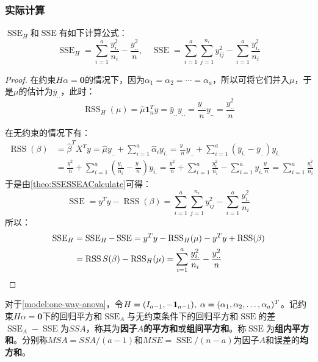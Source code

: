 \subsubsection{实际计算}
\begin{theorem}\label{theo:SSESSEACalculateAOV}
	$\operatorname{SSE}_H$和$\operatorname{SSE}$有如下计算公式：
	\begin{equation*}
		\operatorname{SSE}_H=\sum_{i=1}^{a}\frac{y_{i.}^2}{n_i}-\frac{y_{..}^2}{n},\quad \operatorname{SSE}=\sum_{i=1}^{a}\sum_{j=1}^{n_i}y_{ij}^2-\sum_{i=1}^{a}\frac{y_{i.}^2}{n_i}
	\end{equation*}
\end{theorem}
\begin{proof}
	在约束$H\alpha=\mathbf{0}$的情况下，因为$\alpha_1=\alpha_2=\cdots=\alpha_a$，所以可将它们并入$\mu$，于是$\mu$的估计为$\bar{y}_{..}$，此时：
	\begin{equation*}
		\operatorname{RSS}_H(\mu)=\hat{\mu}\mathbf{1}_n^Ty=\bar{y}_{..}y_{..}=\frac{y_{..}}{n}y_{..}=\frac{y_{..}^2}{n}
	\end{equation*}\par
	在无约束的情况下有：
	\begin{align*}
		\operatorname{RSS}(\beta)&=\hat{\beta}^TX^Ty=\hat{\mu}y_{..}+\sum_{i=1}^{a}\hat{\alpha}_iy_{i.} =\frac{y_{..}}{n}y_{..}+\sum_{i=1}^{a}(\bar{y}_{i.}-\bar{y}_{..})y_{i.} \\
		&=\frac{y_{..}^2}{n}+\sum_{i=1}^{a}\left(\frac{y_{i.}}{n_i}-\frac{y_{..}}{n}\right)y_{i.} =\frac{y_{..}^2}{n}+\sum_{i=1}^{a}\frac{y_{i.}^2}{n_i}-\sum_{i=1}^{a}y_{i.}\frac{y_{..}}{n}=\sum_{i=1}^{a}\frac{y_{i.}^2}{n_i}
	\end{align*}
	于是由\cref{theo:SSESSEACalculate}可得：
	\begin{equation*}
		\operatorname{SSE}=y^Ty-\operatorname{RSS}(\beta)=\sum_{i=1}^{a}\sum_{j=1}^{n_i}y_{ij}^2-\sum_{i=1}^{a}\frac{y_{i.}^2}{n_i}
	\end{equation*}
	所以：
	\begin{align*}
		\operatorname{SSE}_H&=\operatorname{SSE}_H-\operatorname{SSE}=y^Ty-\operatorname{RSS}_H(\mu)-y^Ty+\operatorname{RSS}(\beta) \\
		&=\operatorname{RSS}S(\beta)-\operatorname{RSS}_H(\mu)=\sum_{i=1}^{a}\frac{y_{i.}^2}{n_i}-\frac{y_{..}^2}{n}\qedhere
	\end{align*}
\end{proof}
\begin{definition}
	对于\cref{model:one-way-anova}，令$H=(I_{a-1},-\mathbf{1}_{a-1}),\;\alpha=(\alpha_1, \alpha_2, \dots, \alpha_{a})^T$。记约束$H\alpha=\mathbf{0}$下的回归平方和$\operatorname{SSE}_A$与无约束条件下的回归平方和$\operatorname{SSE}$的差$\operatorname{SSE}_A-\operatorname{SSE}$为$SSA$，称其为\textbf{因子$A$的平方和}或\textbf{组间平方和}。称$\operatorname{SSE}$为\textbf{组内平方和}。分别称$MSA=SSA/(a-1)$和$MSE=\operatorname{SSE}/(n-a)$为因子$A$和误差的\textbf{均方和}。
\end{definition}
